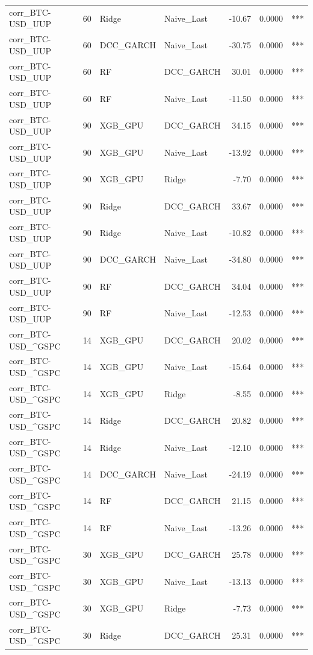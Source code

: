 \begin{table}[H]
\begin{tabular}{llllrrl}
corr_BTC-USD_UUP & 60 & Ridge & Naive_Last & -10.67 & 0.0000 & *** \\
corr_BTC-USD_UUP & 60 & DCC_GARCH & Naive_Last & -30.75 & 0.0000 & *** \\
corr_BTC-USD_UUP & 60 & RF & DCC_GARCH & 30.01 & 0.0000 & *** \\
corr_BTC-USD_UUP & 60 & RF & Naive_Last & -11.50 & 0.0000 & *** \\
corr_BTC-USD_UUP & 90 & XGB_GPU & DCC_GARCH & 34.15 & 0.0000 & *** \\
corr_BTC-USD_UUP & 90 & XGB_GPU & Naive_Last & -13.92 & 0.0000 & *** \\
corr_BTC-USD_UUP & 90 & XGB_GPU & Ridge & -7.70 & 0.0000 & *** \\
corr_BTC-USD_UUP & 90 & Ridge & DCC_GARCH & 33.67 & 0.0000 & *** \\
corr_BTC-USD_UUP & 90 & Ridge & Naive_Last & -10.82 & 0.0000 & *** \\
corr_BTC-USD_UUP & 90 & DCC_GARCH & Naive_Last & -34.80 & 0.0000 & *** \\
corr_BTC-USD_UUP & 90 & RF & DCC_GARCH & 34.04 & 0.0000 & *** \\
corr_BTC-USD_UUP & 90 & RF & Naive_Last & -12.53 & 0.0000 & *** \\
corr_BTC-USD_^GSPC & 14 & XGB_GPU & DCC_GARCH & 20.02 & 0.0000 & *** \\
corr_BTC-USD_^GSPC & 14 & XGB_GPU & Naive_Last & -15.64 & 0.0000 & *** \\
corr_BTC-USD_^GSPC & 14 & XGB_GPU & Ridge & -8.55 & 0.0000 & *** \\
corr_BTC-USD_^GSPC & 14 & Ridge & DCC_GARCH & 20.82 & 0.0000 & *** \\
corr_BTC-USD_^GSPC & 14 & Ridge & Naive_Last & -12.10 & 0.0000 & *** \\
corr_BTC-USD_^GSPC & 14 & DCC_GARCH & Naive_Last & -24.19 & 0.0000 & *** \\
corr_BTC-USD_^GSPC & 14 & RF & DCC_GARCH & 21.15 & 0.0000 & *** \\
corr_BTC-USD_^GSPC & 14 & RF & Naive_Last & -13.26 & 0.0000 & *** \\
corr_BTC-USD_^GSPC & 30 & XGB_GPU & DCC_GARCH & 25.78 & 0.0000 & *** \\
corr_BTC-USD_^GSPC & 30 & XGB_GPU & Naive_Last & -13.13 & 0.0000 & *** \\
corr_BTC-USD_^GSPC & 30 & XGB_GPU & Ridge & -7.73 & 0.0000 & *** \\
corr_BTC-USD_^GSPC & 30 & Ridge & DCC_GARCH & 25.31 & 0.0000 & *** \\

\end{tabular}
\end{table}
